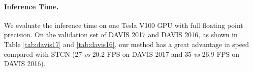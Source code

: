 \documentclass[10pt,twocolumn,letterpaper]{article}
\begin{document}
\begin{table}[!t]
\centering
{}
\caption{Results on the YouTube-VOS 2019 validation set. 
}
\label{tab:youtube19}
\vspace{-1.5em}
\end{table}
\vspace{-1em}
\paragraph{Inference Time.}
We evaluate the inference time on one Tesla V100 GPU with full floating point precision. On the validation set of DAVIS 2017 and DAVIS 2016, as shown in Table \ref{tab:davis17} and \ref{tab:davis16}, our method has a great advantage in speed compared with STCN (27 \textit{vs} 20.2 FPS on DAVIS 2017 and 35 \textit{vs} 26.9 FPS on DAVIS 2016). 
\end{document}
